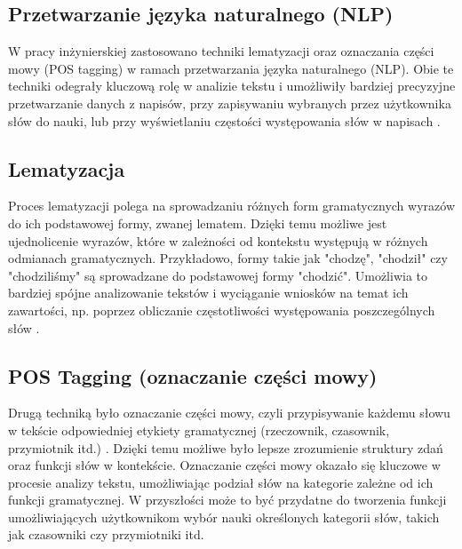 \subsection{Przetwarzanie języka naturalnego (NLP)}
W pracy inżynierskiej zastosowano techniki lematyzacji oraz oznaczania części mowy (POS tagging) w ramach przetwarzania języka naturalnego (NLP). Obie te techniki odegrały kluczową rolę w analizie tekstu i umożliwiły bardziej precyzyjne przetwarzanie danych z napisów, przy zapisywaniu wybranych przez użytkownika słów do nauki, lub przy wyświetlaniu częstości występowania słów w napisach \cite{NLPforNLP}.

\subsection*{Lematyzacja}
Proces lematyzacji polega na sprowadzaniu różnych form gramatycznych wyrazów do ich podstawowej formy, zwanej lematem. Dzięki temu możliwe jest ujednolicenie wyrazów, które w zależności od kontekstu występują w różnych odmianach gramatycznych. Przykładowo, formy takie jak "chodzę", "chodził" czy "chodziliśmy" są sprowadzane do podstawowej formy "chodzić". Umożliwia to bardziej spójne analizowanie tekstów i wyciąganie wniosków na temat ich zawartości, np. poprzez obliczanie częstotliwości występowania poszczególnych słów \cite{NLPforNLP}.

\subsection*{POS Tagging (oznaczanie części mowy)}
Drugą techniką było oznaczanie części mowy, czyli przypisywanie każdemu słowu w tekście odpowiedniej etykiety gramatycznej (rzeczownik, czasownik, przymiotnik itd.)  \cite{NLPforNLP}. Dzięki temu możliwe było lepsze zrozumienie struktury zdań oraz funkcji słów w kontekście. Oznaczanie części mowy okazało się kluczowe w procesie analizy tekstu, umożliwiając podział słów na kategorie zależne od ich funkcji gramatycznej. W przyszłości może to być przydatne do tworzenia funkcji umożliwiających użytkownikom wybór nauki określonych kategorii słów, takich jak czasowniki czy przymiotniki itd.



